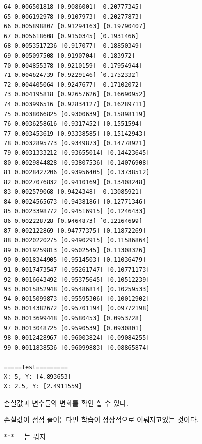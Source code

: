 \documentclass[11pt]{article}
\begin{document}
\begin{Verbatim}[commandchars=\\\{\}]
64 0.006501818 [0.9086001] [0.20777345]
65 0.006192978 [0.9107973] [0.20277873]
66 0.005898807 [0.91294163] [0.19790407]
67 0.005618608 [0.9150345] [0.1931466]
68 0.0053517236 [0.917077] [0.18850349]
69 0.005097508 [0.9190704] [0.183972]
70 0.004855378 [0.9210159] [0.17954944]
71 0.004624739 [0.9229146] [0.1752332]
72 0.004405064 [0.9247677] [0.17102072]
73 0.004195818 [0.92657626] [0.16690952]
74 0.003996516 [0.92834127] [0.16289711]
75 0.0038066825 [0.9300639] [0.15898119]
76 0.0036258616 [0.9317452] [0.1551594]
77 0.003453619 [0.93338585] [0.15142943]
78 0.0032895773 [0.9349873] [0.14778921]
79 0.0031333212 [0.93655014] [0.14423645]
80 0.0029844828 [0.93807536] [0.14076908]
81 0.0028427206 [0.93956405] [0.13738512]
82 0.0027076832 [0.9410169] [0.13408248]
83 0.002579068 [0.9424348] [0.13085921]
84 0.0024565673 [0.9438186] [0.12771346]
85 0.0023398772 [0.94516915] [0.1246433]
86 0.002228728 [0.9464873] [0.12164699]
87 0.002122869 [0.94777375] [0.11872269]
88 0.0020220275 [0.94902915] [0.11586864]
89 0.0019259813 [0.9502545] [0.11308326]
90 0.0018344905 [0.9514503] [0.11036479]
91 0.0017473547 [0.95261747] [0.10771173]
92 0.0016643492 [0.95375645] [0.10512239]
93 0.0015852948 [0.95486814] [0.10259533]
94 0.0015099873 [0.95595306] [0.10012902]
95 0.0014382672 [0.95701194] [0.09772198]
96 0.0013699448 [0.9580453] [0.0953728]
97 0.0013048725 [0.9590539] [0.0930801]
98 0.0012428967 [0.96003824] [0.09084255]
99 0.0011838536 [0.96099883] [0.08865874]

=====Test=========
X: 5, Y: [4.893653]
X: 2.5, Y: [2.4911559]

    \end{Verbatim}

    손실값과 변수들의 변화를 확인 할 수 있다.

손실값이 점점 줄어든다면 학습이 정상적으로 이뤄지고있는 것이다.

*** \_ 는 뭐지


    
    
    
    
\end{document}
